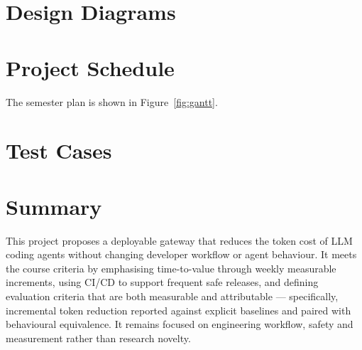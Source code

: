\documentclass[11pt,a4paper]{article}
\begin{document}
\section{Design Diagrams}



\section{Project Schedule}

The semester plan is shown in Figure~\ref{fig:gantt}.



\section{Test Cases}



\section{Summary}

This project proposes a deployable gateway that reduces the token cost of LLM
coding agents without changing developer workflow or agent behaviour. It meets
the course criteria by emphasising time-to-value through weekly measurable
increments, using CI/CD to support frequent safe releases, and defining
evaluation criteria that are both measurable and attributable --- specifically,
incremental token reduction reported against explicit baselines and paired with
behavioural equivalence. It remains focused on engineering workflow, safety and
measurement rather than research novelty.
\end{document}
